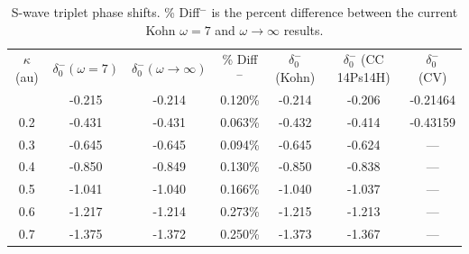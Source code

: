 \documentclass[preprint,showpacs,preprintnumbers,amsmath,amssymb]{revtex4}
\begin{document}
\begin{table}[H]
\centering
\begin{ruledtabular}
\begin{tabular}{c c c c c c c}
$\kappa$ (au) & $\delta_0^- (\omega = 7)$ & $\delta_0^- (\omega \rightarrow \infty)$ & \% Diff$^-$ & $\delta_0^-$ (Kohn) \cite{VanReeth2003} & $\delta_0^-$ (CC 14Ps14H) \cite{Blackwood2002} & $\delta_0^-$ (CV) \cite{Zhang2012} \\
\colrule
0.1 & -0.215 & -0.214 & 0.120\% & -0.214 & -0.206 & -0.21464 \\
0.2 & -0.431 & -0.431 & 0.063\% & -0.432 & -0.414 & -0.43159 \\
0.3 & -0.645 & -0.645 & 0.094\% & -0.645 & -0.624 & --- \\
0.4 & -0.850 & -0.849 & 0.130\% & -0.850 & -0.838 & --- \\
0.5 & -1.041 & -1.040 & 0.166\% & -1.040 & -1.037 & --- \\
0.6 & -1.217 & -1.214 & 0.273\% & -1.215 & -1.213 & --- \\
0.7 & -1.375 & -1.372 & 0.250\% & -1.373 & -1.367 & --- \\
\end{tabular}
\end{ruledtabular}
\caption{S-wave triplet phase shifts. \% Diff$^-$ is the percent difference between the current Kohn $\omega = 7$ and $\omega \rightarrow \infty$ results.}
\label{tab:SWaveTripletPhase}
\end{table}
\end{document}
